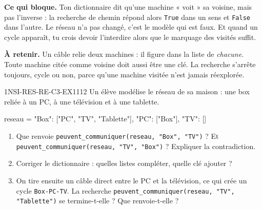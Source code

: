 

\textbf{Ce qui bloque.} Ton dictionnaire dit qu'une machine « voit » sa voisine, mais pas
l'inverse : la recherche de chemin répond alors \lstinline{True} dans un sens et
\lstinline{False} dans l'autre. Le réseau n'a pas changé, c'est le modèle qui est faux. Et
quand un cycle apparaît, tu crois devoir l'interdire alors que le marquage des visités
suffit.

\textbf{À retenir.} Un câble relie deux machines : il figure dans la liste de \emph{chacune}.
Toute machine citée comme voisine doit aussi être une clé. La recherche s'arrête toujours,
cycle ou non, parce qu'une machine visitée n'est jamais réexplorée.

\begin{exercice}{1NSI-RES-RE-C3-EX1}{1}{12}
Un élève modélise le réseau de sa maison : une box reliée à un PC, à une télévision et à une
tablette.
\begin{python}
reseau = {"Box": ["PC", "TV", "Tablette"], "PC": ["Box"], "TV": []}
\end{python}
\begin{enumerate}
  \item Que renvoie \lstinline{peuvent_communiquer(reseau, "Box", "TV")} ? Et
        \lstinline{peuvent_communiquer(reseau, "TV", "Box")} ? Expliquer la contradiction.
  \item Corriger le dictionnaire : quelles listes compléter, quelle clé ajouter ?
  \item On tire ensuite un câble direct entre le PC et la télévision, ce qui crée un cycle
        \lstinline{Box-PC-TV}. La recherche
        \lstinline{peuvent_communiquer(reseau, "TV", "Tablette")} se termine-t-elle ? Que
        renvoie-t-elle ?
\end{enumerate}
\end{exercice}


